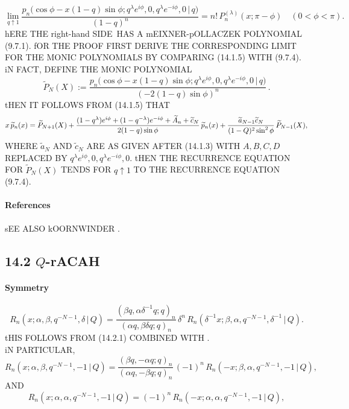 \documentclass[twoside,11pt]{article}
\newcommand\sa{\smallskipamount}
\newcommand\sLP{\\[\sa]}
\newcommand\al\alpha
\newcommand\be\beta
\newcommand\de\delta
\newcommand\la\lambda
\newcommand\wt{\widetilde}
\newcommand\RHS{right-hand SIDE}
\begin{document}
\begin{equation} 
\lim_{q\uparrow1} 
\frac{p_n\big(\cos\phi-x(1-q)\sin\phi; 
q^\la e^{i\phi},0,q^\la e^{-i\phi},0\,|\, q\big)}{(1-q)^n} 
=n!\,P_n^{(\la)}(x;\pi-\phi)\quad 
(0<\phi<\pi). 
\label{178} 
\end{equation} 
hERE THE \RHS\ HAS A mEIXNER-pOLLACZEK POLYNOMIAL (9.7.1). 
fOR THE PROOF FIRST DERIVE THE CORRESPONDING LIMIT FOR THE MONIC POLYNOMIALS BY COMPARING 
(14.1.5) WITH (9.7.4). 
iN FACT, DEFINE THE MONIC POLYNOMIAL 
\[ 
\wt P_N(X):= 
\frac{p_n\big(\cos\phi-x(1-q)\sin\phi; 
q^\la e^{i\phi},0,q^\la e^{-i\phi},0\,|\, q\big)}{(-2(1-q)\sin\phi)^n}\,. 
\] 
tHEN IT FOLLOWS FROM (14.1.5) THAT 
\begin{equation*} 
x\,\wt p_n(x)=\wt P_{N+1}(X) 
+\frac{(1-q^\la)e^{i\phi}+(1-q^{-\la})e^{-i\phi}+\wt A_n+\wt c_N} 
{2(1-q)\sin\phi}\,\wt p_n(x)\\ 
+\frac{\wt a_{N-1} \wt c_N}{(1-Q)^2 \sin^2\phi}\,\wt P_{N-1}(X), 
\end{equation*} 
WHERE $\wt a_N$ AND $\wt c_N$ ARE AS GIVEN AFTER (14.1.3) WITH $A,B,C,D$ REPLACED BY 
$q^\la e^{i\phi},0,q^\la e^{-i\phi},0$. 
tHEN THE RECURRENCE EQUATION FOR $\wt P_N(X)$ TENDS FOR $q\uparrow 1$ TO 
THE RECURRENCE EQUATION (9.7.4). 
% 
\paragraph{References} 
sEE ALSO kOORNWINDER \cite{K7}. 
% 
\subsection*{14.2 $Q$-rACAH} 
\label{sec14.2} 
\paragraph{Symmetry} 
\begin{equation} 
R_n(x;\al,\be,q^{-N-1},\de\,|\, Q) 
=\frac{(\be q,\al\de^{-1}q;q)_n}{(\al q,\be\de q;q)_n}\,\de^n\, 
R_n(\de^{-1}x;\be,\al,q^{-N-1},\de^{-1}\,|\, Q). 
\label{84} 
\end{equation} 
tHIS FOLLOWS FROM (14.2.1) COMBINED WITH . 
\sLP 
iN PARTICULAR, 
\begin{equation} 
R_n(x;\al,\be,q^{-N-1},-1\,|\, Q) 
=\frac{(\be q,-\al q;q)_n}{(\al q,-\be q;q)_n}\,(-1)^n\, 
R_n(-x;\be,\al,q^{-N-1},-1\,|\, Q), 
\label{85} 
\end{equation} 
AND 
\begin{equation} 
R_n(x;\al,\al,q^{-N-1},-1\,|\, Q) 
=(-1)^n\,R_n(-x;\al,\al,q^{-N-1},-1\,|\, Q), 
\label{86} 
\end{equation} 
 
\end{document}
